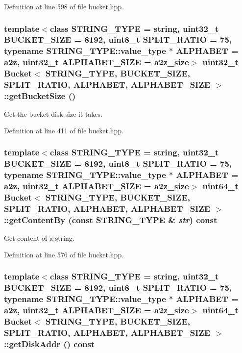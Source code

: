 Definition at line 598 of file bucket.hpp.\hypertarget{classBucket_aa355c777d45203d1a6db708c7998177}{
\subsubsection[{getBucketSize}]{\setlength{\rightskip}{0pt plus 5cm}template$<$class STRING\_\-TYPE  = string, uint32\_\-t BUCKET\_\-SIZE = 8192, uint8\_\-t SPLIT\_\-RATIO = 75, typename STRING\_\-TYPE::value\_\-type $\ast$ ALPHABET = a2z, uint32\_\-t ALPHABET\_\-SIZE = a2z\_\-size$>$ uint32\_\-t {\bf Bucket}$<$ STRING\_\-TYPE, BUCKET\_\-SIZE, SPLIT\_\-RATIO, ALPHABET, ALPHABET\_\-SIZE $>$::getBucketSize ()}}
\label{classBucket_aa355c777d45203d1a6db708c7998177}


Get the bucket disk size it takes. 

Definition at line 411 of file bucket.hpp.\hypertarget{classBucket_1ef6129b70649d002cdfc91cb450c890}{
\subsubsection[{getContentBy}]{\setlength{\rightskip}{0pt plus 5cm}template$<$class STRING\_\-TYPE  = string, uint32\_\-t BUCKET\_\-SIZE = 8192, uint8\_\-t SPLIT\_\-RATIO = 75, typename STRING\_\-TYPE::value\_\-type $\ast$ ALPHABET = a2z, uint32\_\-t ALPHABET\_\-SIZE = a2z\_\-size$>$ uint64\_\-t {\bf Bucket}$<$ STRING\_\-TYPE, BUCKET\_\-SIZE, SPLIT\_\-RATIO, ALPHABET, ALPHABET\_\-SIZE $>$::getContentBy (const STRING\_\-TYPE \& {\em str}) const}}
\label{classBucket_1ef6129b70649d002cdfc91cb450c890}


Get content of a string. 

Definition at line 576 of file bucket.hpp.\hypertarget{classBucket_f32dfcedc5cf09e7acb78cd250c4f1c8}{
\subsubsection[{getDiskAddr}]{\setlength{\rightskip}{0pt plus 5cm}template$<$class STRING\_\-TYPE  = string, uint32\_\-t BUCKET\_\-SIZE = 8192, uint8\_\-t SPLIT\_\-RATIO = 75, typename STRING\_\-TYPE::value\_\-type $\ast$ ALPHABET = a2z, uint32\_\-t ALPHABET\_\-SIZE = a2z\_\-size$>$ uint64\_\-t {\bf Bucket}$<$ STRING\_\-TYPE, BUCKET\_\-SIZE, SPLIT\_\-RATIO, ALPHABET, ALPHABET\_\-SIZE $>$::getDiskAddr () const}}
\label{classBucket_f32dfcedc5cf09e7acb78cd250c4f1c8}


